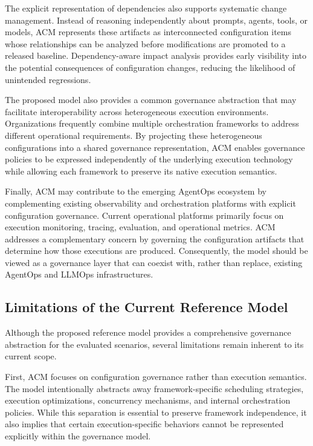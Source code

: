 \documentclass[10pt]{article}
\begin{document}
The explicit representation of dependencies also supports systematic change management. Instead of reasoning independently about prompts, agents, tools, or models, ACM represents these artifacts as interconnected configuration items whose relationships can be analyzed before modifications are promoted to a released baseline. Dependency-aware impact analysis provides early visibility into the potential consequences of configuration changes, reducing the likelihood of unintended regressions.

The proposed model also provides a common governance abstraction that may facilitate interoperability across heterogeneous execution environments. Organizations frequently combine multiple orchestration frameworks to address different operational requirements. By projecting these heterogeneous configurations into a shared governance representation, ACM enables governance policies to be expressed independently of the underlying execution technology while allowing each framework to preserve its native execution semantics.

Finally, ACM may contribute to the emerging AgentOps ecosystem by complementing existing observability and orchestration platforms with explicit configuration governance. Current operational platforms primarily focus on execution monitoring, tracing, evaluation, and operational metrics. ACM addresses a complementary concern by governing the configuration artifacts that determine how those executions are produced. Consequently, the model should be viewed as a governance layer that can coexist with, rather than replace, existing AgentOps and LLMOps infrastructures.

\subsection{Limitations of the Current Reference Model}
\label{sec:model_limitations}

Although the proposed reference model provides a comprehensive governance abstraction for the evaluated scenarios, several limitations remain inherent to its current scope.

First, ACM focuses on configuration governance rather than execution semantics. The model intentionally abstracts away framework-specific scheduling strategies, execution optimizations, concurrency mechanisms, and internal orchestration policies. While this separation is essential to preserve framework independence, it also implies that certain execution-specific behaviors cannot be represented explicitly within the governance model.
\end{document}
